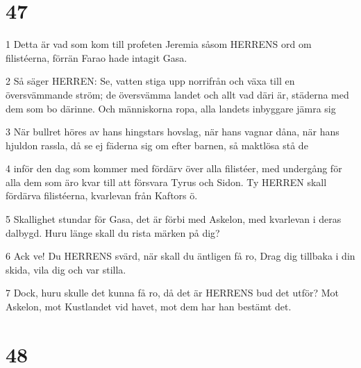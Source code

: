 \chapter{47}

\par 1 Detta är vad som kom till profeten Jeremia såsom HERRENS ord om filistéerna, förrän Farao hade intagit Gasa.
\par 2 Så säger HERREN: Se, vatten stiga upp norrifrån och växa till en översvämmande ström; de översvämma landet och allt vad däri är, städerna med dem som bo därinne. Och människorna ropa, alla landets inbyggare jämra sig
\par 3 När bullret höres av hans hingstars hovslag, när hans vagnar dåna, när hans hjuldon rassla, då se ej fäderna sig om efter barnen, så maktlösa stå de
\par 4 inför den dag som kommer med fördärv över alla filistéer, med undergång för alla dem som äro kvar till att försvara Tyrus och Sidon. Ty HERREN skall fördärva filistéerna, kvarlevan från Kaftors ö.
\par 5 Skallighet stundar för Gasa, det är förbi med Askelon, med kvarlevan i deras dalbygd. Huru länge skall du rista märken på dig?
\par 6 Ack ve! Du HERRENS svärd, när skall du äntligen få ro, Drag dig tillbaka i din skida, vila dig och var stilla.
\par 7 Dock, huru skulle det kunna få ro, då det är HERRENS bud det utför? Mot Askelon, mot Kustlandet vid havet, mot dem har han bestämt det.

\chapter{48}

